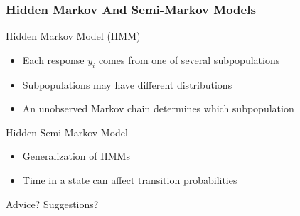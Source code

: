 \documentclass{beamer}
\begin{document}
\begin{frame}
\frametitle{Hidden Markov And Semi-Markov Models}
  \begin{block}{Hidden Markov Model (HMM)}
  \begin{itemize}
    \item Each response $y_i$ comes from one of several subpopulations
    \item Subpopulations may have different distributions
    \item An unobserved Markov chain determines which subpopulation
  \end{itemize}
  \end{block}

  \begin{block}{Hidden Semi-Markov Model}
  \begin{itemize}
    \item Generalization of HMMs
    \item Time in a state can affect transition probabilities
  \end{itemize}
  \end{block}
\end{frame}

\begin{frame}
  \Huge{\centerline{Advice? Suggestions?}}
\end{frame}
\end{document}

